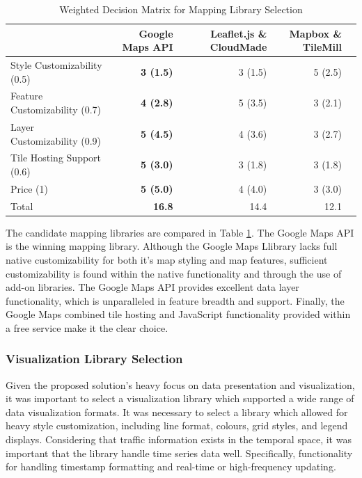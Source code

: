 \documentclass{report}
\begin{document}
\begin{table}
\centering
    \begin{tabular}{l |r r r l}
    ~                             & \textbf{Google Maps API} & Leaflet.js \& CloudMade & Mapbox \& TileMill \\ \hline
    Style Customizability  (0.5)  & \textbf{3 (1.5)}         & 3 (1.5)                 & 5 (2.5)            \\
    Feature Customizability (0.7) & \textbf{4 (2.8)}         & 5 (3.5)                 & 3 (2.1)            \\
    Layer Customizability (0.9)   & \textbf{5 (4.5)}         & 4 (3.6)                 & 3 (2.7)            \\
    Tile Hosting Support (0.6)    & \textbf{5 (3.0)}           & 3 (1.8)                 & 3 (1.8)            \\
    Price (1)                     & \textbf{5 (5.0)}           & 4 (4.0)                   & 3 (3.0)              \\ \hline
    Total                         & \textbf{16.8}            & 14.4                    & 12.1               \\
    \end{tabular}
\caption{Weighted Decision Matrix for Mapping Library Selection}
\label{table:mapping-matrix}
\end{table}

The candidate mapping libraries are compared in Table \ref{table:mapping-matrix}. The Google Maps API is the winning mapping library. Although the Google Maps Llibrary lacks full native customizability for both it's map styling and map features, sufficient customizability is found within the native functionality and through the use of add-on libraries. The Google Maps API provides excellent data layer functionality, which is unparalleled in feature breadth and support. Finally, the Google Maps combined tile hosting and JavaScript functionality provided within a free service make it the clear choice.

\subsubsection{Visualization Library Selection}

Given the proposed solution's heavy focus on data presentation and visualization, it was important to select a visualization library which supported a wide range of data visualization formats. It was necessary to select a library which allowed for heavy style customization, including line format, colours, grid styles, and legend displays. Considering that traffic information exists in the temporal space, it was important that the library handle time series data well. Specifically, functionality for handling timestamp formatting and real-time or high-frequency updating.
\end{document}
